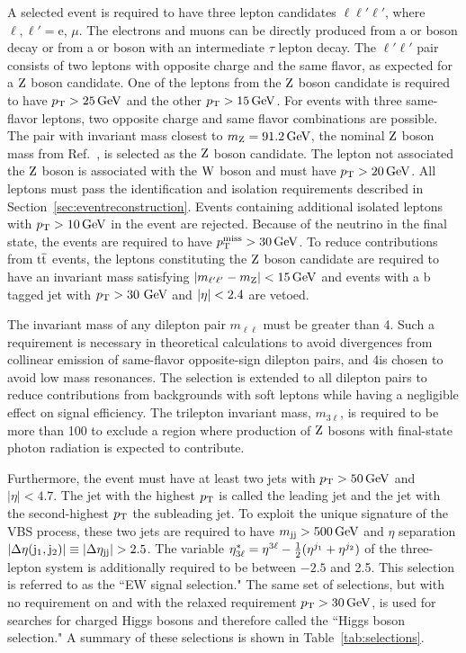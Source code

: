 A selected event is required to have three lepton candidates $\ell\ell'\ell'$,
where $\ell, \ell' = \mathrm{e}$, $\mu$.
The electrons and muons can be directly produced from a \W or \Z boson decay or from a \W or \Z
boson with an intermediate $\tau$ lepton decay.
The $\ell'\ell'$ pair consists of two leptons with opposite charge and the same flavor,
as expected for a $\mathrm{Z}$ boson candidate.
One of the leptons from the $\mathrm{Z}$ boson candidate is required to have $p_{\mathrm{T}} > 25\,\text{Ge\hspace{-.08em}V}$ and the other
$p_{\mathrm{T}} > 15\,\text{Ge\hspace{-.08em}V}$.
For events with three same-flavor leptons, two opposite charge and same flavor combinations are possible.
The pair with invariant mass closest to $m_{\mathrm{Z}} = 91.2\,\text{Ge\hspace{-.08em}V}$, the nominal $\mathrm{Z}$ boson mass from
Ref.~\cite{Tanabashi:2018oca}, is selected as the $\mathrm{Z}$ boson candidate.
The lepton not associated the $\mathrm{Z}$ boson is associated with the $\mathrm{W}$ boson and must have $p_{\mathrm{T}} > 20\,\text{Ge\hspace{-.08em}V}$. All leptons
must pass the identification and isolation requirements
described in Section~\ref{sec:eventreconstruction}.
Events containing additional isolated leptons with $p_{\mathrm{T}} > 10\,\text{Ge\hspace{-.08em}V}$ in the event are rejected.
Because of the neutrino in the final state, the events are required to have $p_{\mathrm{T}}^\text{miss} > 30\,\text{Ge\hspace{-.08em}V}$. 
To reduce contributions from ${\mathrm{t}\overline{\mathrm{t}}}$ events,
the leptons constituting the $\mathrm{Z}$ boson candidate are required to have an invariant mass satisfying
$\left|m_{\ell'\ell'} - m_{\mathrm{Z}}\right| < 15\,\text{Ge\hspace{-.08em}V} $ and events with a 
b tagged jet with $p_{\mathrm{T}} > 30\,\,\text{Ge\hspace{-.08em}V}$ and $\lvert \eta \rvert < 2.4$ are vetoed.

The invariant mass of any dilepton
pair $m_{\ell\ell}$ must be greater than 4\GeV.
Such a requirement is necessary in theoretical calculations to avoid divergences 
from collinear emission of same-flavor opposite-sign 
dilepton pairs, and 4\GeV is chosen to avoid low mass resonances.
The selection is extended to all dilepton pairs to 
reduce contributions from backgrounds with soft leptons while having a negligible effect on signal efficiency.
The trilepton invariant mass, $m_{3\ell}$, is required to be more than 100\GeV
to exclude a region where production of $\mathrm{Z}$ bosons with final-state photon radiation
is expected to contribute.

Furthermore, the event must have at least two jets with $p_{\mathrm{T}} > 50\,\text{Ge\hspace{-.08em}V}$ and $|\eta| < 4.7$. 
The jet with the highest $p_{\mathrm{T}}$ is 
called the leading jet and the jet with the second-highest $p_{\mathrm{T}}$ the subleading jet. 
To exploit the unique signature of the VBS process, these two jets are required to have
$m_{\mathrm{jj}} > 500\,\text{Ge\hspace{-.08em}V}$ and $\eta$ separation 
$\left|\Delta\eta(\mathrm{j}_{1}, \mathrm{j}_{2}) \right| \equiv \left|\Delta\eta_{\mathrm{jj}} \right| > 2.5$.
The variable $\eta^{*}_{3\ell} = \eta^{3\ell} - \frac{1}{2}(\eta^{j_{1}} + \eta^{j_{2}})$
of the three-lepton system is additionally required to be between $-2.5$ and 2.5. This selection is
referred to as the ``EW signal selection." The same set of selections, but with no requirement on 
{\etas} and with the relaxed requirement $p_{\mathrm{T}} > 30\,\text{Ge\hspace{-.08em}V}$, 
is used for searches for charged Higgs bosons and therefore called the ``Higgs boson selection."
A summary of these selections is shown in Table~\ref{tab:selections}. 

